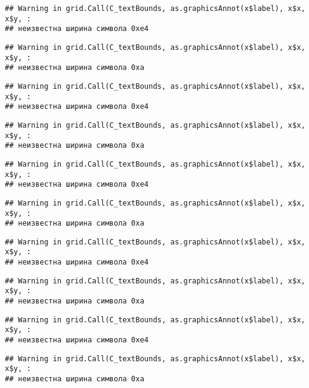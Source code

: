 \documentclass[
]{article}
\begin{document}
\begin{verbatim}
## Warning in grid.Call(C_textBounds, as.graphicsAnnot(x$label), x$x, x$y, :
## неизвестна ширина символа 0xe4
\end{verbatim}

\begin{verbatim}
## Warning in grid.Call(C_textBounds, as.graphicsAnnot(x$label), x$x, x$y, :
## неизвестна ширина символа 0xa
\end{verbatim}

\begin{verbatim}
## Warning in grid.Call(C_textBounds, as.graphicsAnnot(x$label), x$x, x$y, :
## неизвестна ширина символа 0xe4
\end{verbatim}

\begin{verbatim}
## Warning in grid.Call(C_textBounds, as.graphicsAnnot(x$label), x$x, x$y, :
## неизвестна ширина символа 0xa
\end{verbatim}

\begin{verbatim}
## Warning in grid.Call(C_textBounds, as.graphicsAnnot(x$label), x$x, x$y, :
## неизвестна ширина символа 0xe4
\end{verbatim}

\begin{verbatim}
## Warning in grid.Call(C_textBounds, as.graphicsAnnot(x$label), x$x, x$y, :
## неизвестна ширина символа 0xa
\end{verbatim}

\begin{verbatim}
## Warning in grid.Call(C_textBounds, as.graphicsAnnot(x$label), x$x, x$y, :
## неизвестна ширина символа 0xe4
\end{verbatim}

\begin{verbatim}
## Warning in grid.Call(C_textBounds, as.graphicsAnnot(x$label), x$x, x$y, :
## неизвестна ширина символа 0xa
\end{verbatim}

\begin{verbatim}
## Warning in grid.Call(C_textBounds, as.graphicsAnnot(x$label), x$x, x$y, :
## неизвестна ширина символа 0xe4
\end{verbatim}

\begin{verbatim}
## Warning in grid.Call(C_textBounds, as.graphicsAnnot(x$label), x$x, x$y, :
## неизвестна ширина символа 0xa
\end{verbatim}
\end{document}
